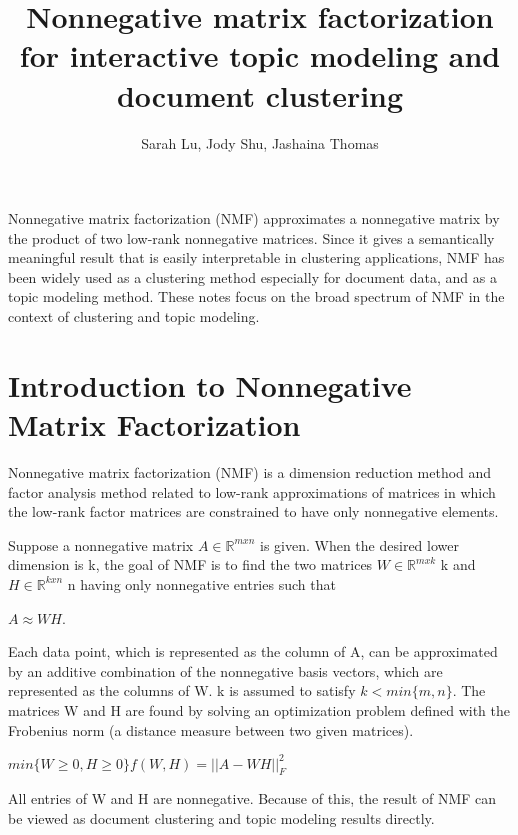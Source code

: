 \documentclass[11pt, oneside]{article}   	%
\title{Nonnegative matrix factorization for interactive topic modeling and document clustering}
\author{Sarah Lu, Jody Shu, Jashaina Thomas}
\begin{document}
\maketitle

Nonnegative matrix factorization (NMF) approximates a nonnegative matrix by the product of two low-rank nonnegative matrices. Since it gives a semantically meaningful result that is easily interpretable in clustering applications, NMF has been widely used as a clustering method especially for document data, and as a topic modeling method. These notes focus on the broad spectrum of NMF in the context of clustering and topic modeling.

\section{Introduction to Nonnegative Matrix Factorization}

Nonnegative matrix factorization (NMF) is a dimension reduction method and factor analysis method related to low-rank approximations of matrices in which the low-rank factor matrices are constrained to have only nonnegative elements.

Suppose a nonnegative matrix $A \in \mathbb{R}^{mxn} $ is given. When the desired lower dimension is k, the goal of NMF is to find the two matrices $W \in \mathbb{R}^{mxk} $ k and $H \in \mathbb{R}^{kxn} $ n having only nonnegative entries such that

\begin{center}
$A  \approx W H$.

\end{center}

Each data point, which is represented as the column of A, can be approximated by an additive combination of the nonnegative basis vectors, which are represented as the columns of W. k is assumed to satisfy $k < min\{m, n\}$. The matrices W and H are found by solving an optimization problem defined with the Frobenius norm (a distance measure between two given matrices).
 
 \begin{center}
 $min\{W\ge0,H\ge0\}f(W,H)=||A-WH||^2_F$
 \end{center}

All entries of W and H are nonnegative. Because of this, the result of NMF can be viewed as document clustering and topic modeling results directly.

\end{document}
